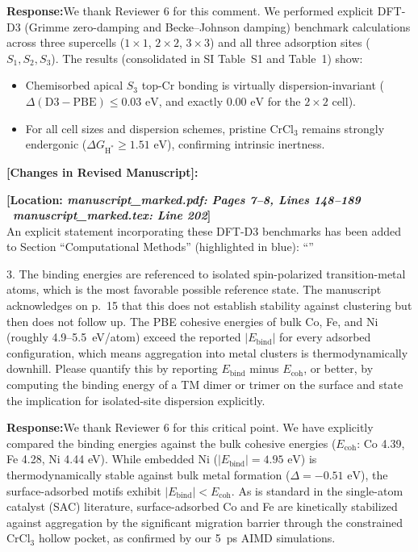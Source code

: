 \documentclass[11pt, sans, a4paper]{moderncv}
\newcommand{\response}{\vspace{0.4em}\noindent\textbf{\color{actionblue}Response:}\hspace{0.5em}}
\newcommand{\manuscriptchange}[1]{{\renewcommand{\label}[1]{}\vspace{0.4em}\noindent\textbf{\color{acsblue}[Changes in Revised Manuscript]:}\par\nopagebreak\vspace{0.15em}#1\vspace{0.4em}}}
\begin{document}
\response We thank Reviewer 6 for this comment. We performed explicit DFT-D3 (Grimme zero-damping and Becke--Johnson damping) benchmark calculations across three supercells ($1\times 1$, $2\times 2$, $3\times 3$) and all three adsorption sites ($S_1, S_2, S_3$). The results (consolidated in SI Table~S1 and Table~1) show:
\begin{itemize}[leftmargin=1.5em, itemsep=0.2em]
\item Chemisorbed apical $S_3$ top-Cr bonding is virtually dispersion-invariant ($\Delta(\text{D3}-\text{PBE}) \le 0.03\text{ eV}$, and exactly $0.00\text{ eV}$ for the $2\times 2$ cell).
\item For all cell sizes and dispersion schemes, pristine $\text{CrCl}_3$ remains strongly endergonic ($\Delta G_{\mathrm{H}^*} \ge 1.51\text{ eV}$), confirming intrinsic inertness.
\end{itemize}

\manuscriptchange{\textbf{[Location: \textit{manuscript\_marked.pdf: Pages 7--8, Lines 148--189} \textbar\ \textit{manuscript\_marked.tex: Line 202}]}\\ An explicit statement incorporating these DFT-D3 benchmarks has been added to Section ``Computational Methods'' (highlighted in blue): ``{\itshape \ExecuteMetaData[manuscript_marked.tex]{DispersionCorrection}}''}

\vspace{0.8em}

\begin{reviewercomment}
3. The binding energies are referenced to isolated spin-polarized transition-metal atoms, which is the most favorable possible reference state. The manuscript acknowledges on p.~15 that this does not establish stability against clustering but then does not follow up. The PBE cohesive energies of bulk Co, Fe, and Ni (roughly 4.9--5.5~eV/atom) exceed the reported $|E_{\mathrm{bind}}|$ for every adsorbed configuration, which means aggregation into metal clusters is thermodynamically downhill. Please quantify this by reporting $E_{\mathrm{bind}}$ minus $E_{\mathrm{coh}}$, or better, by computing the binding energy of a TM dimer or trimer on the surface and state the implication for isolated-site dispersion explicitly.
\end{reviewercomment}

\response We thank Reviewer 6 for this critical point. We have explicitly compared the binding energies against the bulk cohesive energies ($E_{\mathrm{coh}}$: Co 4.39, Fe 4.28, Ni 4.44 eV). While embedded Ni ($|E_{\mathrm{bind}}| = 4.95\text{ eV}$) is thermodynamically stable against bulk metal formation ($\Delta = -0.51\text{ eV}$), the surface-adsorbed motifs exhibit $|E_{\mathrm{bind}}| < E_{\mathrm{coh}}$. As is standard in the single-atom catalyst (SAC) literature, surface-adsorbed Co and Fe are kinetically stabilized against aggregation by the significant migration barrier through the constrained $\text{CrCl}_3$ hollow pocket, as confirmed by our 5~ps AIMD simulations.
\end{document}
